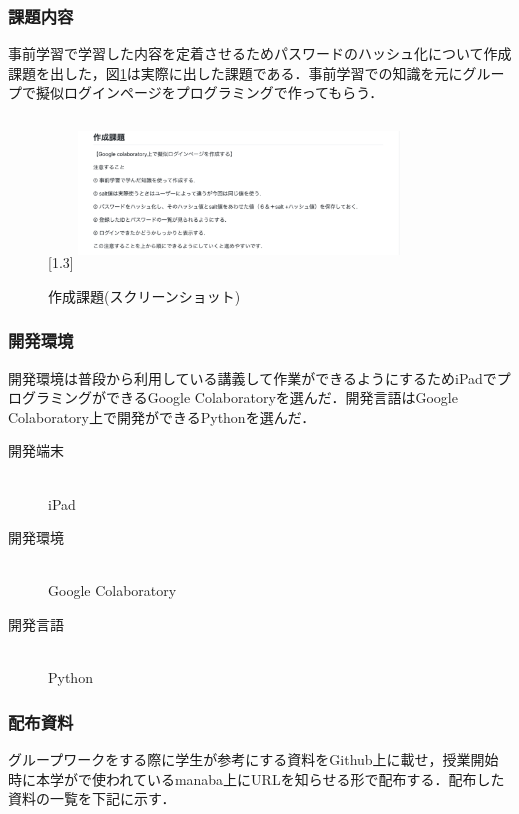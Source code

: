 \documentclass[a4j,11pt]{jsarticle}
\begin{document}
\newpage


\subsubsection{課題内容}
事前学習で学習した内容を定着させるためパスワードのハッシュ化について作成課題を出した，図\ref{kadai1}は実際に出した課題である．事前学習での知識を元にグループで擬似ログインページをプログラミングで作ってもらう．

\begin{figure}[h]
\begin{center}
\scalebox{1.5}[1.3]{
 \includegraphics[clip,width=85mm,height=40mm]{kadai1.pdf}
 }
\end{center}
 \caption{作成課題(スクリーンショット)}
 \label{kadai1}
\end{figure}


\subsubsection{開発環境}
開発環境は普段から利用している講義して作業ができるようにするためiPadでプログラミングができるGoogle Colaboratoryを選んだ．開発言語はGoogle Colaboratory上で開発ができるPythonを選んだ．

\begin{description}
\item[開発端末]\mbox{}\\iPad
\item[開発環境]\mbox{}\\Google Colaboratory
\item[開発言語]\mbox{}\\Python
\end{description}

\newpage 

\subsubsection{配布資料}
グループワークをする際に学生が参考にする資料をGithub上に載せ，授業開始時に本学がで使われているmanaba上にURLを知らせる形で配布する．配布した資料の一覧を下記に示す．
\end{document}
